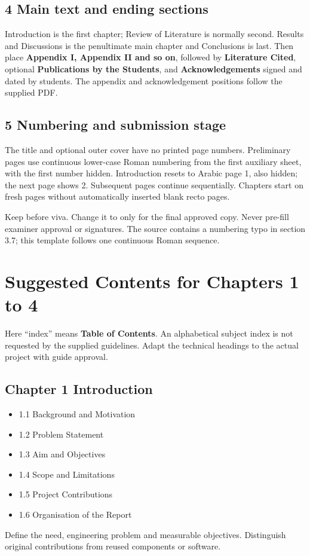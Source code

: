 \documentclass[11pt,a4paper]{article}
\newcommand{\Page}[1]{\clearpage\section*{#1}}
\newcommand{\Key}[1]{\textbf{#1}}
\begin{document}
\subsection*{4 Main text and ending sections}
Introduction is the first chapter; Review of Literature is normally second.
Results and Discussions is the penultimate main chapter and Conclusions is last.
Then place \Key{Appendix I, Appendix II and so on}, followed by
\Key{Literature Cited}, optional \Key{Publications by the Students}, and
\Key{Acknowledgements} signed and dated by students. The appendix and
acknowledgement positions follow the supplied PDF.

\subsection*{5 Numbering and submission stage}
The title and optional outer cover have no printed page numbers. Preliminary
pages use continuous lower-case Roman numbering from the first auxiliary sheet,
with the first number hidden. Introduction resets to Arabic page 1, also hidden;
the next page shows 2. Subsequent pages continue sequentially. Chapters start on
fresh pages without automatically inserted blank recto pages.

Keep \texttt{\string\finalcopyfalse} before viva. Change it to
\texttt{\string\finalcopytrue} only for the final approved copy. Never pre-fill
examiner approval or signatures. The source contains a numbering typo in section
3.7; this template follows one continuous Roman sequence.

\Page{Suggested Contents for Chapters 1 to 4}
Here ``index'' means \Key{Table of Contents}. An alphabetical subject index is
not requested by the supplied guidelines. Adapt the technical headings to the
actual project with guide approval.

\subsection*{Chapter 1 Introduction}
\begin{itemize}
\item 1.1 Background and Motivation
\item 1.2 Problem Statement
\item 1.3 Aim and Objectives
\item 1.4 Scope and Limitations
\item 1.5 Project Contributions
\item 1.6 Organisation of the Report
\end{itemize}
Define the need, engineering problem and measurable objectives. Distinguish
original contributions from reused components or software.
\end{document}
